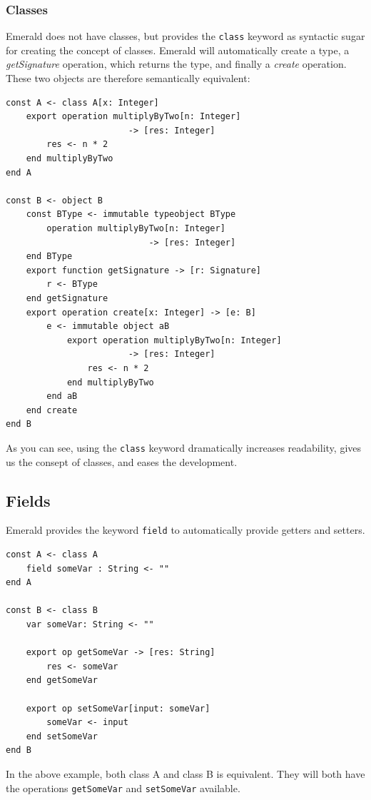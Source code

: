 \subsubsection{Classes}
Emerald does not have classes, but provides the \verb|class| keyword as syntactic sugar for creating the concept of classes. Emerald will automatically create a type, a \textit{getSignature} operation, which returns the type, and finally a \textit{create} operation. These two objects are therefore semantically equivalent:
\begin{lstlisting}[language=emerald]
const A <- class A[x: Integer]
    export operation multiplyByTwo[n: Integer]
                        -> [res: Integer]
        res <- n * 2
    end multiplyByTwo
end A

const B <- object B
    const BType <- immutable typeobject BType
        operation multiplyByTwo[n: Integer]
                            -> [res: Integer]
    end BType
    export function getSignature -> [r: Signature]
        r <- BType
    end getSignature
    export operation create[x: Integer] -> [e: B]
        e <- immutable object aB
            export operation multiplyByTwo[n: Integer]
                        -> [res: Integer]
                res <- n * 2
            end multiplyByTwo
        end aB
    end create
end B
\end{lstlisting}
As you can see, using the \verb|class| keyword dramatically increases readability, gives us the consept of classes, and eases the development.

\subsection{Fields}\label{emerald:fields}
Emerald provides the keyword \verb|field| to automatically provide getters and setters.
\begin{lstlisting}[language=emerald]
const A <- class A
    field someVar : String <- ""
end A

const B <- class B
    var someVar: String <- ""
    
    export op getSomeVar -> [res: String]
        res <- someVar
    end getSomeVar
    
    export op setSomeVar[input: someVar]
        someVar <- input
    end setSomeVar
end B
\end{lstlisting}
In the above example, both class A and class B is equivalent. They will both have the operations \verb|getSomeVar| and \verb|setSomeVar| available.


